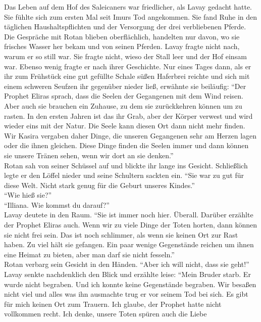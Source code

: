 Das Leben auf dem Hof des Saleicaners war friedlicher, als Lavay gedacht hatte. Sie fühlte sich zum 
ersten Mal seit Imurs Tod angekommen. Sie fand Ruhe in den täglichen Haushaltspflichten und der 
Versorgung der drei verbliebenen Pferde. Die Gespräche mit Rotan blieben oberflächlich, handelten 
nur davon, wo sie frisches Wasser her bekam und von seinen Pferden. Lavay fragte nicht nach, warum 
er so still war. Sie fragte nicht, wieso der Stall leer und der Hof einsam war. Ebenso wenig fragte 
er nach ihrer Geschichte. Nur eines Tages dann, als er ihr zum Frühstück eine gut gefüllte Schale 
süßen Haferbrei reichte und sich mit einem schweren Seufzen ihr gegenüber nieder ließ, erwähnte sie 
beiläufig: ``Der Prophet Eliras sprach, dass die Seelen der Gegangenen mit dem Wind reisen. Aber 
auch sie brauchen ein Zuhause, zu dem sie zurückkehren können um zu rasten. In den ersten Jahren 
ist das ihr Grab, aber der Körper verwest und wird wieder eins mit der Natur. Die Seele kann diesen 
Ort dann nicht mehr finden. Wir Kasira vergaben daher Dinge, die unseren Gegangenen sehr am Herzen 
lagen oder die ihnen gleichen. Diese Dinge finden die Seelen immer und dann können sie unsere 
Tränen sehen, wenn wir dort an sie denken.''\\
Rotan sah von seiner Schüssel auf und blickte ihr lange ins Gesicht. Schließlich legte er den Löffel 
nieder und seine Schultern sackten ein. ``Sie war zu gut für diese Welt. Nicht stark genug für die 
Geburt unseres Kindes.''\\
``Wie hieß sie?''\\
``Illiana. Wie kommst du darauf?''\\
Lavay deutete in den Raum. ``Sie ist immer noch hier. Überall. Darüber erzählte der Prophet Eliras 
auch. Wenn wir zu viele Dinge der Toten horten, dann können sie nicht frei sein. Das ist noch 
schlimmer, als wenn sie keinen Ort zur Rast haben. Zu viel hält sie gefangen. Ein paar wenige 
Gegenstände reichen um ihnen eine Heimat zu bieten, aber man darf sie nicht fesseln.''\\
Rotan verbarg sein Gesicht in den Händen. ``Aber ich will nicht, dass sie geht!''\\
Lavay senkte nachdenklich den Blick und erzählte leise: ``Mein Bruder starb. Er wurde nicht 
begraben. Und ich konnte keine Gegenstände begraben. Wir besaßen nicht viel und alles was 
ihn ausmachte trug er vor seinem Tod bei sich. Es gibt für mich keinen Ort zum Trauern. Ich 
glaube, der Prophet hatte nicht vollkommen recht. Ich denke, unsere Toten spüren auch die Liebe 
